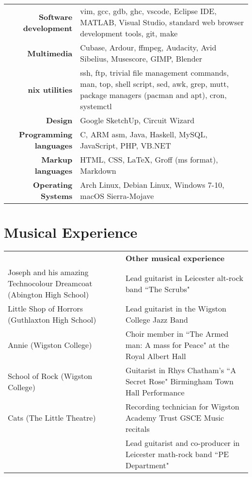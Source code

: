 \documentclass{article}
\begin{document}
{\renewcommand{\arraystretch}{2}

\begin{tabular}{ r | p{10cm} }

{\large\bfseries Software development} & {vim, gcc, gdb, ghc, vscode, Eclipse IDE, MATLAB, Visual Studio, standard web browser development tools, git, make}\\
{\large\bfseries Multimedia} & {Cubase, Ardour, ffmpeg, Audacity, Avid Sibelius, Musescore, GIMP, Blender} \\
{\large\bfseries *nix utilities} & {ssh, ftp, trivial file management commands, man, top, shell script, sed, awk, grep, mutt, package managers (pacman and apt), cron, systemctl} \\
{\large\bfseries Design} & {Google SketchUp, Circuit Wizard} \\
{\large\bfseries Programming languages} & {C, ARM asm, Java, Haskell, MySQL, JavaScript, PHP, VB.NET}\\
{\large\bfseries Markup languages} & {HTML, CSS, \LaTeX, Groff (ms format), Markdown}\\
{\large\bfseries Operating Systems} & {Arch Linux, Debian Linux, Windows 7-10, macOS Sierra-Mojave}\\


\end{tabular}

\section{Musical Experience}

{\renewcommand{\arraystretch}{1.4}

\begin{tabular}{>{\centering}p{} | >{\centering}p{} }
{\large\bfseries Shows as a pit-band guitarist} & {\large\bfseries Other musical experience}
\tabularnewline
Joseph and his amazing Technocolour Dreamcoat (Abington High School) & Lead guitarist in Leicester alt-rock band ``The Scrubs"
\tabularnewline
Little Shop of Horrors (Guthlaxton High School) & Lead guitarist in the Wigston College Jazz Band
\tabularnewline
Annie (Wigston College) & Choir member in ``The Armed man: A mass for Peace" at the Royal Albert Hall
\tabularnewline
School of Rock (Wigston College) & Guitarist in Rhys Chatham's ``A Secret Rose" Birmingham Town Hall Performance
\tabularnewline
Cats (The Little Theatre) & Recording technician for Wigston Academy Trust GSCE Music recitals
\tabularnewline
{} & Lead guitarist and co-producer in Leicester math-rock band ``PE Department"


\end{tabular}}}
\end{document}
